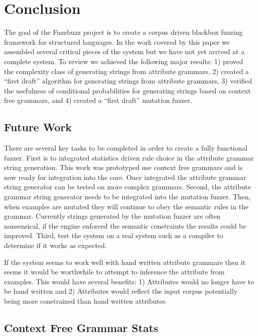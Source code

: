 \section{Conclusion}

The goal of the Fuzzbuzz project is to create a corpus driven blackbox fuzzing
framework for structured languages. In the work covered by this paper we
assembled several critical pieces of the system but we have not yet arrived at a
complete system. To review we achieved the following major results: 1) proved
the complexity class of generating strings from attribute grammars, 2) created a
``first draft'' algorithm for generating strings from attribute grammars, 3)
verified the usefulness of conditional probabilities for generating strings
based on context free grammars, and 4) created a ``first draft'' mutation
fuzzer.

\subsection{Future Work}

There are several key tasks to be completed in order to create a fully
functional fuzzer. First is to integrated statistics driven rule choice in
the attribute grammar string generation. This work was prototyped use context
free grammars and is now ready for integration into the core. Once integrated
the attribute grammar string generator can be tested on more complex grammars.
Second, the attribute grammar string generator needs to be integrated into the
mutation fuzzer. Then, when examples are mutated they will continue to obey the
semantic rules in the grammar. Currently strings generated by the mutation
fuzzer are often nonsensical, if the engine enforced the semantic constraints
the results could be improved. Third, test the system on a real system such as a
compiler to determine if it works as expected.

If the system seems to work well with hand written attribute grammars then it
seems it would be worthwhile to attempt to inference the attribute from
examples. This would have several benefits: 1) Attributes would no longer have
to be hand written and 2) Attributes would reflect the input corpus potentially
being more constrained than hand written attributes.

\subsection{Context Free Grammar Stats}

